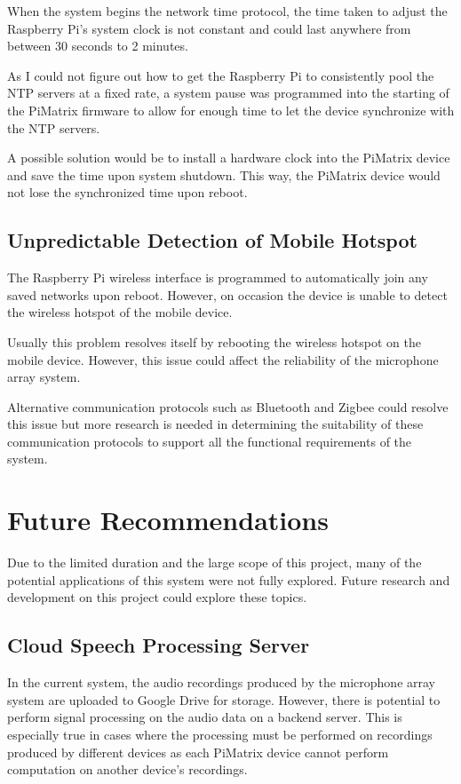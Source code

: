 \documentclass[hidelinks,12pt]{report} %
\begin{document}
When the system begins the network time protocol, the time taken to adjust the Raspberry Pi’s system clock is not constant and could last anywhere from between 30 seconds to 2 minutes. 

As I could not figure out how to get the Raspberry Pi to consistently pool the NTP servers at a fixed rate, a system pause was programmed into the starting of the PiMatrix firmware to allow for enough time to let the device synchronize with the NTP servers. 

A possible solution would be to install a hardware clock into the PiMatrix device and save the time upon system shutdown. This way, the PiMatrix device would not lose the synchronized time upon reboot.

\subsection{Unpredictable Detection of Mobile Hotspot}

The Raspberry Pi wireless interface is programmed to automatically join any saved networks upon reboot. However, on occasion the device is unable to detect the wireless hotspot of the mobile device. 

Usually this problem resolves itself by rebooting the wireless hotspot on the mobile device. However, this issue could affect the reliability of the microphone array system. 

Alternative communication protocols such as Bluetooth and Zigbee could resolve this issue but more research is needed in determining the suitability of these communication protocols to support all the functional requirements of the system. 

\section{Future Recommendations}

Due to the limited duration and the large scope of this project, many of the potential applications of this system were not fully explored. Future research and development on this project could explore these topics.

\subsection{Cloud Speech Processing Server}

In the current system, the audio recordings produced by the microphone array system are uploaded to Google Drive for storage. However, there is potential to perform signal processing on the audio data on a backend server. This is especially true in cases where the processing must be performed on recordings produced by different devices as each PiMatrix device cannot perform computation on another device’s recordings. 
\end{document}
